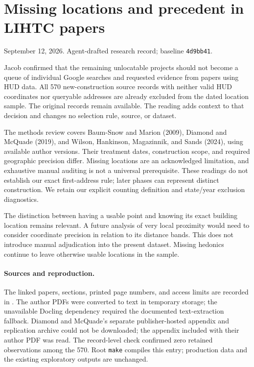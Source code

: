\documentclass[11pt]{article}
\begin{document}
\section*{Missing locations and precedent in LIHTC papers}
\noindent September 12, 2026. Agent-drafted research record; baseline
\texttt{4d9bb41}.

Jacob confirmed that the remaining unlocatable projects should not become a queue
of individual Google searches and requested evidence from papers using HUD data.
All 570 new-construction source records with neither valid HUD coordinates nor
queryable addresses are already excluded from the dated location sample. The
original records remain available. The reading adds context to that decision and
changes no selection rule, source, or dataset.

The methods review covers Baum-Snow and Marion (2009), Diamond and McQuade (2019),
and Wilson, Hankinson, Magazinnik, and Sands (2024), using available author versions.
Their treatment dates, construction scope, and required geographic precision differ.
Missing locations are an acknowledged limitation, and exhaustive manual auditing
is not a universal prerequisite. These readings do not establish our exact
first-address rule; later phases can represent distinct construction. We retain
our explicit counting definition and state/year exclusion diagnostics.

The distinction between having a usable point and knowing its exact building
location remains relevant. A future analysis of very local proximity would need
to consider coordinate precision in relation to its distance bands. This does not
introduce manual adjudication into the present dataset. Missing hedonics continue
to leave otherwise usable locations in the sample.

\paragraph{Sources and reproduction.} The linked papers, sections, printed page
numbers, and access limits are recorded in
.
The author PDFs were converted to text in temporary storage; the unavailable
Docling dependency required the documented text-extraction fallback. Diamond and
McQuade's separate publisher-hosted appendix and replication archive could not be
downloaded; the appendix included with their author PDF was read. The record-level
check confirmed zero retained observations among the 570. Root \texttt{make}
compiles this entry; production data and the existing exploratory outputs are
unchanged.
\clearpage
\end{document}

